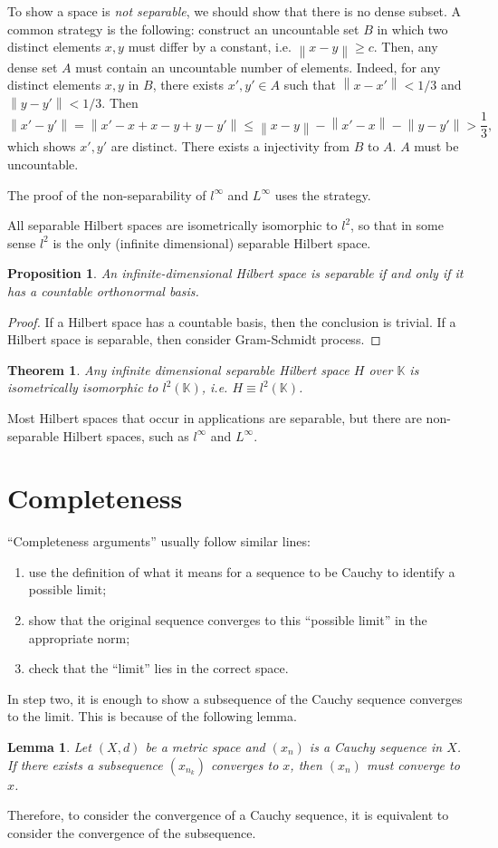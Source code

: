 \documentclass[12pt,a4paper]{report}
\numberwithin{equation}{section}
\theoremstyle{mystyle}
\newtheorem{theorem}[definition]{Theorem}
\newtheorem{lemma}[definition]{Lemma}
\newtheorem{proposition}[definition]{Proposition}
\newcommand{\K}{\mathbb{K}}
\newcommand{\norm}[1]{\left\lVert #1 \right\rVert}
\begin{document}
	To show a space is \emph{not separable}, we should show that there is no dense subset. A common strategy is the following: construct an uncountable set $B$ in which two distinct elements $x,y$ must differ by a constant, i.e. $\norm{x-y}\geq c$. Then, any dense set $A$ must contain an uncountable number of elements. Indeed, for any distinct elements $x,y$ in $B$, there exists $x',y'\in A$ such that $\norm{x-x'}<1/3$ and $\norm{y-y'}<1/3$. Then
	$$
	\norm{x'-y'} =\norm{x'-x+x-y+y-y'}\leq \norm{x-y}-\norm{x'-x}-\norm{y-y'}>\frac{1}{3},
	$$
	which shows $x',y'$ are distinct. There exists a injectivity from $B$ to $A$. $A$ must be uncountable.
	
	The proof of the non-separability of $l^\infty$ and $L^\infty$ uses the strategy.
	
	All separable Hilbert spaces are isometrically isomorphic to $l^2$, so that in some sense $l^2$ is the only (infinite dimensional) separable Hilbert space.
	\begin{proposition}
		An infinite-dimensional Hilbert space is separable if and only if it has a countable orthonormal basis.
	\end{proposition}
	\begin{proof}
		If a Hilbert space has a countable basis, then the conclusion is trivial. If a Hilbert space is separable, then consider Gram-Schmidt process.
	\end{proof}

	\begin{theorem}\label{thm:basis}
		Any infinite dimensional separable Hilbert space $H$ over $\K$ is isometrically isomorphic to $l^2(\K)$, i.e. $H\equiv l^2(\K)$.
	\end{theorem}

	Most Hilbert spaces that occur in applications are separable, but there are non-separable Hilbert spaces, such as $l^\infty$ and $L^\infty$.

	
	\section{Completeness}
	``Completeness arguments'' usually follow similar lines:
	\begin{enumerate}
		\item use the definition of what it means for a sequence to be Cauchy to identify a possible limit;
		\item show that the original sequence converges to this ``possible limit'' in the appropriate norm;
		\item check that the ``limit'' lies in the correct space.
	\end{enumerate}
	In step two, it is enough to show a subsequence of the Cauchy sequence converges to the limit. This is because of the following lemma.
	\begin{lemma}
		Let $(X,d)$ be a metric space and $(x_n)$ is a Cauchy sequence in $X$. If there exists a subsequence $(x_{n_k})$ converges to $x$, then $(x_n)$ must converge to $x$.
	\end{lemma}
	Therefore, to consider the convergence of a Cauchy sequence, it is equivalent to consider the convergence of the subsequence.
\end{document}
